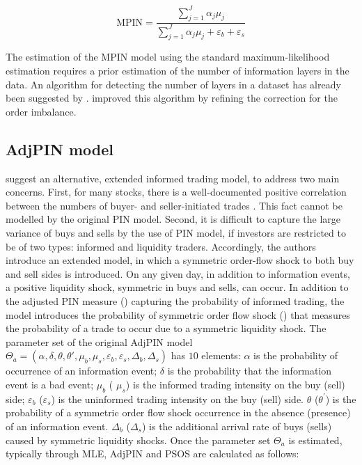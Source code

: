 \begin{equation}
\label{eq:mpinvalue}
\textrm{MPIN} =\frac{\sum_{j = 1}^{J}\alpha_{j}\mu_{j}}{\sum_{j = 1}^{J}\alpha_{j}\mu_{j}+\varepsilon_{b}+\varepsilon_{s}}
\end{equation}

The estimation of the MPIN model using the standard maximum-likelihood estimation requires a prior estimation of the number of information layers in the data. An algorithm for detecting the number of layers in a dataset has already been suggested by  \cite{ersan2016multilayer}. \cite{Ersan2022Identifying} improved this algorithm by refining the correction for the order imbalance. 

\subsection{AdjPIN model}

\cite{duarte2009why} suggest an alternative, extended informed trading model, to address two main concerns. First, for many stocks, there is a well-documented positive correlation between the numbers of buyer- and seller-initiated trades \citep{duarte2009why}. This fact cannot be modelled by the original PIN model. Second,  it is difficult to capture the large variance of buys and sells by the use of PIN model, if investors are restricted to be of two types: informed and liquidity traders. Accordingly, the authors introduce an extended model, in which a symmetric order-flow shock to both buy and sell sides is introduced. On any given day, in addition to information events, a positive liquidity shock, symmetric in buys and sells, can occur. In addition to the adjusted PIN measure () capturing the probability of informed trading, the model introduces the probability of symmetric order flow shock () that measures the probability of a trade to occur due to a symmetric liquidity shock. The parameter set of the original AdjPIN model \(\Theta_a =\left(\alpha,\delta,\theta,\theta',\mu_{b},\mu_{s},\varepsilon_{b},\varepsilon_{s},\Delta_{b},\Delta_{s}\right)\) has $10$ elements: \(\alpha\) is the probability of occurrence of an information event; \(\delta\) is the probability that the information event is a bad event; \(\mu_{b}\) ( \(\mu_{s}\)) is the informed trading intensity on the buy (sell) side; \(\varepsilon_{b}\) (\(\varepsilon_{s}\)) is the uninformed trading intensity on the buy (sell) side. \( \theta\) (\( \theta^{'}\)) is the probability of a symmetric order flow shock occurrence in the absence (presence) of an information event. \(\Delta_{b}\) (\(\Delta_{s}\)) is the additional arrival rate of buys (sells) caused by symmetric liquidity shocks. Once the parameter set \(\Theta_a\) is estimated, typically through MLE, AdjPIN and PSOS are calculated as follows:

